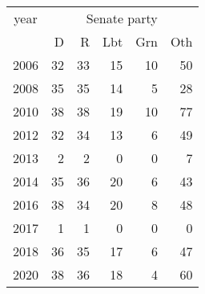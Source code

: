 \footnotesize\begin{tabular}[t]{lrrrrr}
\toprule
\multicolumn{1}{c}{year} & \multicolumn{5}{c}{Senate party} \\
\cmidrule(l{3pt}r{3pt}){1-1} \cmidrule(l{3pt}r{3pt}){2-6}
  & D & R & Lbt & Grn & Oth\\
\midrule
2006 & 32 & 33 & 15 & 10 & 50\\
2008 & 35 & 35 & 14 & 5 & 28\\
2010 & 38 & 38 & 19 & 10 & 77\\
2012 & 32 & 34 & 13 & 6 & 49\\
2013 & 2 & 2 & 0 & 0 & 7\\
2014 & 35 & 36 & 20 & 6 & 43\\
2016 & 38 & 34 & 20 & 8 & 48\\
2017 & 1 & 1 & 0 & 0 & 0\\
2018 & 36 & 35 & 17 & 6 & 47\\
2020 & 38 & 36 & 18 & 4 & 60\\
\bottomrule
\end{tabular}
